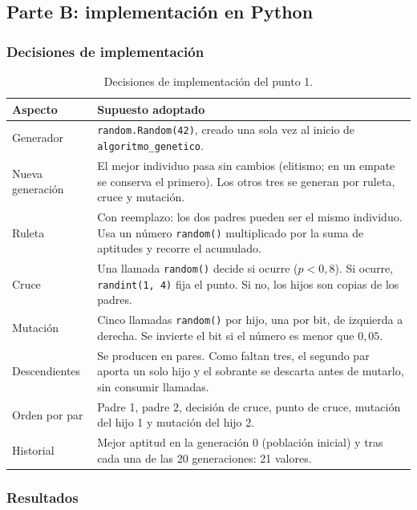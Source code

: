 \documentclass[12pt,a4paper]{article}
\begin{document}
\subsection{Parte B: implementación en Python}

\subsubsection{Decisiones de implementación}

\begin{table}[H]
\centering\small
\renewcommand{\arraystretch}{1.15}
\begin{tabular}{|l|>{\raggedright\arraybackslash}p{9.6cm}|}
\hline
\textbf{Aspecto} & \textbf{Supuesto adoptado} \\ \hline
Generador & \texttt{random.Random(42)}, creado una sola vez al inicio de
\texttt{algoritmo\_genetico}. \\ \hline
Nueva generación & El mejor individuo pasa sin cambios (elitismo; en un
empate se conserva el primero). Los otros tres se generan por ruleta, cruce
y mutación. \\ \hline
Ruleta & Con reemplazo: los dos padres pueden ser el mismo individuo. Usa un
número \texttt{random()} multiplicado por la suma de aptitudes y recorre el
acumulado. \\ \hline
Cruce & Una llamada \texttt{random()} decide si ocurre ($p<0{,}8$). Si ocurre,
\texttt{randint(1, 4)} fija el punto. Si no, los hijos son copias de los
padres. \\ \hline
Mutación & Cinco llamadas \texttt{random()} por hijo, una por bit, de
izquierda a derecha. Se invierte el bit si el número es menor que
$0{,}05$. \\ \hline
Descendientes & Se producen en pares. Como faltan tres, el segundo par
aporta un solo hijo y el sobrante se descarta antes de mutarlo, sin consumir
llamadas. \\ \hline
Orden por par & Padre 1, padre 2, decisión de cruce, punto de cruce,
mutación del hijo 1 y mutación del hijo 2. \\ \hline
Historial & Mejor aptitud en la generación 0 (población inicial) y tras cada
una de las 20 generaciones: 21 valores. \\ \hline
\end{tabular}
\caption{Decisiones de implementación del punto 1.}
\label{tab:p1-decisiones}
\end{table}

\subsubsection{Resultados}
\end{document}
